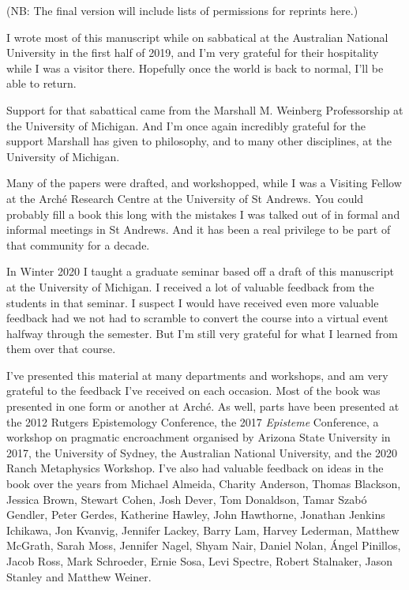 \documentclass[
  11pt,
]{book}
\begin{document}
(NB: The final version will include lists of permissions for reprints here.)

I wrote most of this manuscript while on sabbatical at the Australian National University in the first half of 2019, and I'm very grateful for their hospitality while I was a visitor there. Hopefully once the world is back to normal, I'll be able to return.

Support for that sabattical came from the Marshall M. Weinberg Professorship at the University of Michigan. And I'm once again incredibly grateful for the support Marshall has given to philosophy, and to many other disciplines, at the University of Michigan.

Many of the papers were drafted, and workshopped, while I was a Visiting Fellow at the Arché Research Centre at the University of St Andrews. You could probably fill a book this long with the mistakes I was talked out of in formal and informal meetings in St Andrews. And it has been a real privilege to be part of that community for a decade.

In Winter 2020 I taught a graduate seminar based off a draft of this manuscript at the University of Michigan. I received a lot of valuable feedback from the students in that seminar. I suspect I would have received even more valuable feedback had we not had to scramble to convert the course into a virtual event halfway through the semester. But I'm still very grateful for what I learned from them over that course.

I've presented this material at many departments and workshops, and am very grateful to the feedback I've received on each occasion. Most of the book was presented in one form or another at Arché. As well, parts have been presented at the 2012 Rutgers Epistemology Conference, the 2017 \emph{Episteme} Conference, a workshop on pragmatic encroachment organised by Arizona State University in 2017, the University of Sydney, the Australian National University, and the 2020 Ranch Metaphysics Workshop. I've also had valuable feedback on ideas in the book over the years from Michael Almeida, Charity Anderson, Thomas Blackson, Jessica Brown, Stewart Cohen, Josh Dever, Tom Donaldson, Tamar Szabó Gendler, Peter Gerdes, Katherine Hawley, John Hawthorne, Jonathan Jenkins Ichikawa, Jon Kvanvig, Jennifer Lackey, Barry Lam, Harvey Lederman, Matthew McGrath, Sarah Moss, Jennifer Nagel, Shyam Nair, Daniel Nolan, Ángel Pinillos, Jacob Ross, Mark Schroeder, Ernie Sosa, Levi Spectre, Robert Stalnaker, Jason Stanley and Matthew Weiner.
\end{document}

